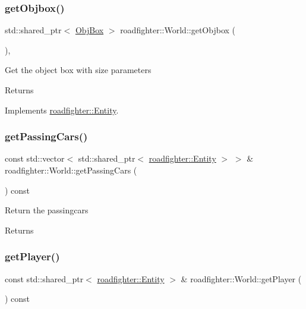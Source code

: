 \subsubsection{\texorpdfstring{get\+Objbox()}{getObjbox()}}
{\footnotesize\ttfamily std\+::shared\+\_\+ptr$<$ \hyperlink{structObjBox}{Obj\+Box} $>$ roadfighter\+::\+World\+::get\+Objbox (\begin{DoxyParamCaption}{ }\end{DoxyParamCaption})\hspace{0.3cm}{\ttfamily [override]}, {\ttfamily [virtual]}}

Get the object box with size parameters \begin{DoxyReturn}{Returns}

\end{DoxyReturn}


Implements \hyperlink{classroadfighter_1_1Entity_af14340d04a725175a6d221f23c35fa0c}{roadfighter\+::\+Entity}.

\mbox{\label{classroadfighter_1_1World_a97a458e140c6da6cd93422b683bcc87c}} 
\subsubsection{\texorpdfstring{get\+Passing\+Cars()}{getPassingCars()}}
{\footnotesize\ttfamily const std\+::vector$<$ std\+::shared\+\_\+ptr$<$ \hyperlink{classroadfighter_1_1Entity}{roadfighter\+::\+Entity} $>$ $>$ \& roadfighter\+::\+World\+::get\+Passing\+Cars (\begin{DoxyParamCaption}{ }\end{DoxyParamCaption}) const}

Return the passingcars \begin{DoxyReturn}{Returns}

\end{DoxyReturn}
\mbox{\label{classroadfighter_1_1World_a50d685095c0ed48bef2b3f1ba20bb608}} 
\subsubsection{\texorpdfstring{get\+Player()}{getPlayer()}}
{\footnotesize\ttfamily const std\+::shared\+\_\+ptr$<$ \hyperlink{classroadfighter_1_1Entity}{roadfighter\+::\+Entity} $>$ \& roadfighter\+::\+World\+::get\+Player (\begin{DoxyParamCaption}{ }\end{DoxyParamCaption}) const}

